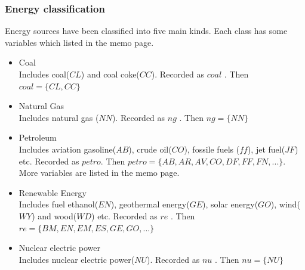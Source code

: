 \documentclass{mcmthesis}
\begin{document}
\subsubsection{Energy classification}
Energy sources have been classified into five main kinds. Each class has some variables which listed in the memo page.
\begin{itemize}
    \item Coal\\
    Includes coal($CL$) and coal coke($CC$). Recorded as $coal$ . Then $coal = \{CL, CC\}$
    \item Natural Gas\\
    Includes natural gas ($NN$). Recorded as $ng$ . Then $ng = \{NN\}$
    \item Petroleum\\
    Includes aviation gasoline($AB$), crude oil($CO$), fossile fuels ($ff$), jet fuel($JF$) etc.
    Recorded as $petro$. Then $petro = \{AB, AR, AV, CO, DF, FF, FN, ... \}$. More variables are listed in the memo page.
    \item Renewable Energy\\
    Includes fuel ethanol($EN$), geothermal energy($GE$), solar energy($GO$), wind($WY$) and wood($WD$) etc.
    Recorded as $re$ . Then $re = \{BM, EN, EM, ES, GE, GO, ... \}$
    \item Nuclear electric power\\
    Includes nuclear electric power($NU$). Recorded as $nu$ . Then $nu = \{NU\}$
\end{itemize}
\end{document}
